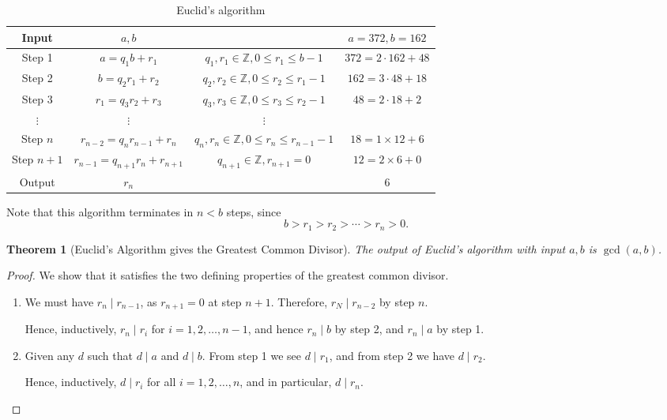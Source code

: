 \documentclass{article}
\newtheorem{theorem}{Theorem}[section]
\theoremstyle{definition}
\theoremstyle{remark}
\newcommand{\pqty}[1]{\left(#1\right)}
\newcommand{\divides}{\mid}
\newcommand{\ZZ}{\mathbb{Z}}
\begin{document}
\begin{table}
    \centering
    \begin{tabular}{c|cc|c}
        Input & \(a, b\) && \(a = 372, b = 162\) \\
        \hline
        Step 1 & \(a = q_1 b + r_1\) & \(q_1, r_1 \in \ZZ, 0 \leq r_1 \leq b - 1\) & \(372 = 2 \cdot \boxed{162} + \boxed{48}\) \\
        Step 2 & \(b = q_2 r_1 + r_2\) & \(q_2, r_2 \in \ZZ, 0 \leq r_2 \leq r_1 - 1\) & \(162 = 3 \cdot \boxed{48} + \boxed{18}\) \\
        Step 3 & \(r_1 = q_3 r_2 + r_3\) & \(q_3, r_3 \in \ZZ, 0 \leq r_3 \leq r_2 - 1\) & \(48 = 2 \cdot \boxed{18} + \boxed{2}\) \\
        \(\vdots\) & \(\vdots\) & \(\vdots\) & \\
        Step \(n\) & \(r_{n - 2} = q_n r_{n - 1} + r_n\) & \(q_n, r_n \in \ZZ, 0 \leq r_n \leq r_{n - 1} - 1\) & \(18 = 1 \times \boxed{12} + \boxed{6}\) \\
        Step \(n + 1\) & \(r_{n - 1} = q_{n + 1} r_n + r_{n + 1}\) & \(q_{n + 1} \in \ZZ, \boxed{r_{n + 1} = 0}\) & \(12 = 2 \times \boxed{6} + \boxed{0}\) \\
        \hline
        Output & \(r_n\) & & \(6\)
    \end{tabular}
    \caption{Euclid's algorithm}
    \label{tab:euclids-algorithm}
\end{table}

Note that this algorithm terminates in \(n < b\) steps, since
\[
    b > r_1 > r_2 > \cdots > r_n > 0.
\]

\begin{theorem}[Euclid's Algorithm gives the Greatest Common Divisor]
    The output of Euclid's algorithm with input \(a, b\) is \(\gcd\pqty{a, b}\).
\end{theorem}

\begin{proof}
    We show that it satisfies the two defining properties of the greatest common divisor.

    \begin{enumerate}
        \item We must have \(r_n \divides r_{n - 1}\), as \(r_{n + 1} = 0\) at step \(n + 1\). Therefore, \(r_N \divides r_{n - 2}\) by step \(n\).
        
        Hence, inductively, \(r_n \divides r_i\) for \(i = 1, 2, \ldots, n - 1\), and hence \(r_n \divides b\) by step 2, and \(r_n \divides a\) by step 1.

        \item Given any \(d\) such that \(d \divides a\) and \(d \divides b\). From step 1 we see \(d \divides r_1\), and from step 2 we have \(d \divides r_2\).
        
        Hence, inductively, \(d \divides r_i\) for all \(i = 1, 2, \ldots, n\), and in particular, \(d \divides r_n\).
    \end{enumerate}
\end{proof}
\end{document}
